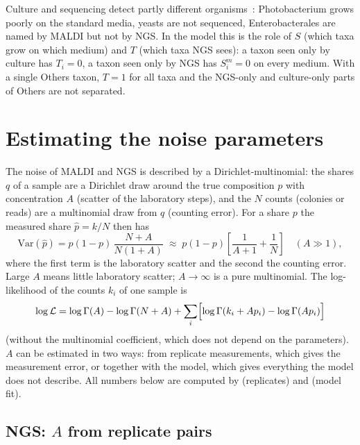 \documentclass[11pt,a4paper]{article}
\begin{document}
\noindent
Culture and sequencing detect partly different organisms~\cite{sung_utility_2017, van_reckem_next-generation_2021}: Photobacterium grows poorly on the standard media, yeasts are not sequenced, Enterobacterales are named by MALDI but not by NGS. In the model this is the role of $S$ (which taxa grow on which medium) and $T$ (which taxa NGS sees): a taxon seen only by culture has $T_i = 0$, a taxon seen only by NGS has $S^m_i = 0$ on every medium. With a single Others taxon, $T = 1$ for all taxa and the NGS-only and culture-only parts of Others are not separated.

\section{Estimating the noise parameters}\label{sec:noise}

The noise of MALDI and NGS is described by a Dirichlet-multinomial: the shares $q$ of a sample are a Dirichlet draw around the true composition $p$ with concentration $A$ (scatter of the laboratory steps), and the $N$ counts (colonies or reads) are a multinomial draw from $q$ (counting error). For a share $p$ the measured share $\hat p = k/N$ then has
\begin{equation}\label{eq:dmvar}
\mathrm{Var}(\hat p) = p(1-p)\,\frac{N + A}{N(1 + A)} \;\approx\; p(1-p)\left[\frac{1}{A+1} + \frac{1}{N}\right] \quad (A \gg 1),
\end{equation}
where the first term is the laboratory scatter and the second the counting error. Large $A$ means little laboratory scatter; $A \to \infty$ is a pure multinomial. The log-likelihood of the counts $k_i$ of one sample is
\begin{equation}\label{eq:dmlik}
\log\mathcal{L} = \log\Gamma(A) - \log\Gamma(N+A) + \sum_i \Bigl[\log\Gamma(k_i + A p_i) - \log\Gamma(A p_i)\Bigr]
\end{equation}
(without the multinomial coefficient, which does not depend on the parameters). $A$ can be estimated in two ways: from replicate measurements, which gives the measurement error, or together with the model, which gives everything the model does not describe. All numbers below are computed by  (replicates) and  (model fit).

\subsection{NGS: $A$ from replicate pairs}
\end{document}
